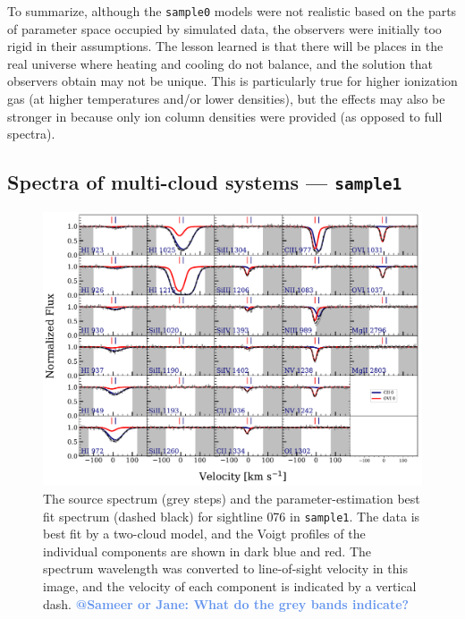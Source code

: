 \documentclass[fleqn,usenatbib]{mnras}
\makeatletter
\newcommand{\atsameer}[1]{\textcolor{CornflowerBlue}{\textbf{@Sameer or Jane: #1}}}
\makeatother
\begin{document}
To summarize,
although the \texttt{sample0} models were not realistic based on the parts of parameter space occupied by simulated data, the observers were initially too rigid in their assumptions.
The lesson learned is that there will be places in the real universe where heating and cooling do not balance, and the solution that observers obtain may not be unique.
This is particularly true for higher ionization gas (at higher temperatures and/or lower densities),
but the effects may also be stronger in because only ion column densities were provided (as opposed to full spectra).

\subsection{Spectra of multi-cloud systems --- \texttt{sample1}}
\label{s: results -- sample1}

\begin{figure}
    \centering
    \includegraphics[width=\textwidth]{figures/sample1/Models_076.pdf}
    \caption{
    The source spectrum (grey steps) and the parameter-estimation best fit spectrum (dashed black) for sightline 076 in \texttt{sample1}.
    The data is best fit by a two-cloud model, and the Voigt profiles of the individual components are shown in dark blue and red.
    The spectrum wavelength was converted to line-of-sight velocity in this image,
    and the velocity of each component is indicated by a vertical dash.
    \atsameer{What do the grey bands indicate?}
    }
    \label{f: sample1 spectrum}
\end{figure}
\end{document}
